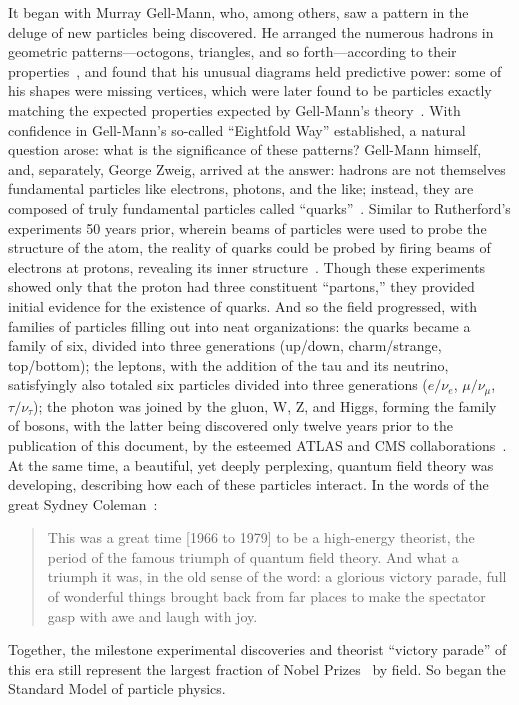 \begin{dissertationintroduction}
It began with Murray Gell-Mann, who, among others, saw a pattern in the deluge of new particles being discovered. 
He arranged the numerous hadrons in geometric patterns---octogons, triangles, and so forth---according to their properties~\cite{Gell-Mann:1961omu}, and found that his unusual diagrams held predictive power: some of his shapes were missing vertices, which were later found to be particles exactly matching the expected properties expected by Gell-Mann's theory~\cite{PhysRevLett.12.204}. 
With confidence in Gell-Mann's so-called ``Eightfold Way'' established, a natural question arose: what is the significance of these patterns? 
Gell-Mann himself, and, separately, George Zweig, arrived at the answer: hadrons are not themselves fundamental particles like electrons, photons, and the like; instead, they are composed of truly fundamental particles called ``quarks''~\cite{Lichtenberg:784713}.
Similar to Rutherford's experiments 50 years prior, wherein beams of particles were used to probe the structure of the atom, the reality of quarks could be probed by firing beams of electrons at protons, revealing its inner structure~\cite{PhysRevLett.23.930, PhysRevLett.23.935}. 
Though these experiments showed only that the proton had three constituent ``partons,'' they provided initial evidence for the existence of quarks.
And so the field progressed, with families of particles filling out into neat organizations: 
the quarks became a family of six, divided into three generations (up/down, charm/strange, top/bottom); %
the leptons, with the addition of the tau and its neutrino, satisfyingly also totaled six particles divided into three generations ($e/\nu_e$, $\mu/\nu_\mu$, $\tau/\nu_\tau$); %
the photon was joined by the gluon, W, Z, and Higgs, forming the family of bosons, with the latter being discovered only twelve years prior to the publication of this document, by the esteemed ATLAS and CMS collaborations~\cite{ATLASdisc, CMSdisc}. %
At the same time, a beautiful, yet deeply perplexing, quantum field theory was developing, describing how each of these particles interact. 
In the words of the great Sydney Coleman~\cite{Coleman}:
\begin{quote}
    This was a great time [1966 to 1979] to be a high-energy theorist, the period of the famous triumph of quantum field theory. 
    And what a triumph it was, in the old sense of the word: a glorious victory parade, full of wonderful things brought back from far places to make the spectator gasp with awe and laugh with joy. 
\end{quote}
Together, the milestone experimental discoveries and theorist ``victory parade'' of this era still represent the largest fraction of Nobel Prizes~\cite{ParticleNobels} by field. 
So began the Standard Model of particle physics.


\end{dissertationintroduction}
